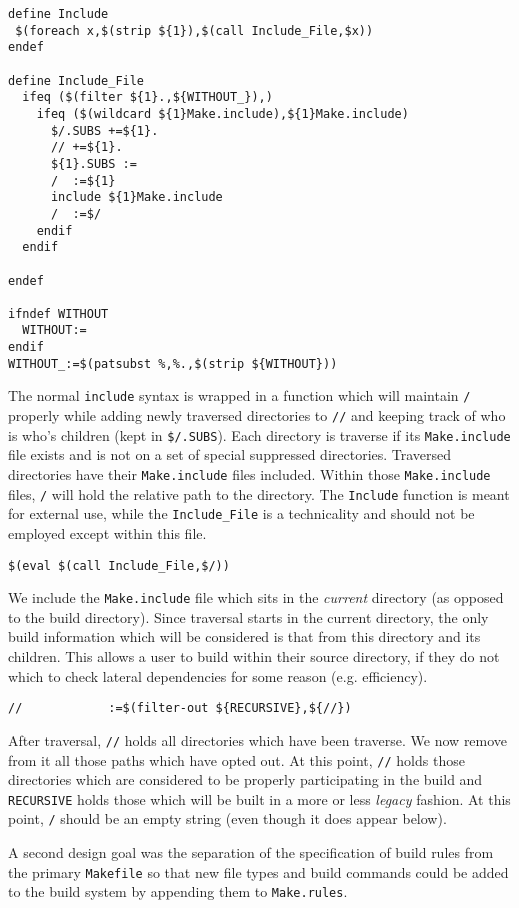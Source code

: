 \documentclass{article}
\begin{document}
\begin{verbatim}
define Include
 $(foreach x,$(strip ${1}),$(call Include_File,$x))
endef

define Include_File
  ifeq ($(filter ${1}.,${WITHOUT_}),)
    ifeq ($(wildcard ${1}Make.include),${1}Make.include)
      $/.SUBS +=${1}.
      // +=${1}.
      ${1}.SUBS :=
      /  :=${1}
      include ${1}Make.include
      /  :=$/
    endif
  endif

endef

ifndef WITHOUT
  WITHOUT:=
endif
WITHOUT_:=$(patsubst %,%.,$(strip ${WITHOUT}))
\end{verbatim}
The normal \verb+include+ syntax is wrapped in a function which will
maintain \verb+/+ properly while adding newly traversed directories to
\verb+//+ and keeping track of who is who's children (kept in
\verb+$/.SUBS+).  Each directory
is traverse if its \verb+Make.include+ file exists and is not on
a set of special suppressed directories.  Traversed directories
have their \verb+Make.include+ files included.  Within those
\verb+Make.include+ files, \verb+/+ will hold the relative path
to the directory.  The \verb+Include+ function is meant for external
use, while the \verb+Include_File+ is a technicality and should not
be employed except within this file.

\begin{verbatim}
$(eval $(call Include_File,$/))
\end{verbatim}
We include the \verb+Make.include+ file which sits in the {\em current}
directory (as opposed to the build directory).  Since traversal
starts in the current directory, the only build information which
will be considered is that from this directory and its children.
This allows a user to build within their source directory, if they
do not which to check lateral dependencies for some reason (e.g.
efficiency).

\begin{verbatim}
//            :=$(filter-out ${RECURSIVE},${//})
\end{verbatim}
After traversal, \verb+//+ holds all directories which have been
traverse.  We now remove from it all those paths which have opted
out.  At this point, \verb+//+ holds those directories which are
considered to be properly participating in the build and
\verb+RECURSIVE+ holds those which will be built in a more or less
{\em legacy} fashion.  At this point, \verb+/+ should be an
empty string (even though it does appear below).

A second design goal was the separation of the specification of
build rules from the primary \verb+Makefile+ so that new file types
and build commands could be added to the build system by appending
them to \verb+Make.rules+.
\end{document}
